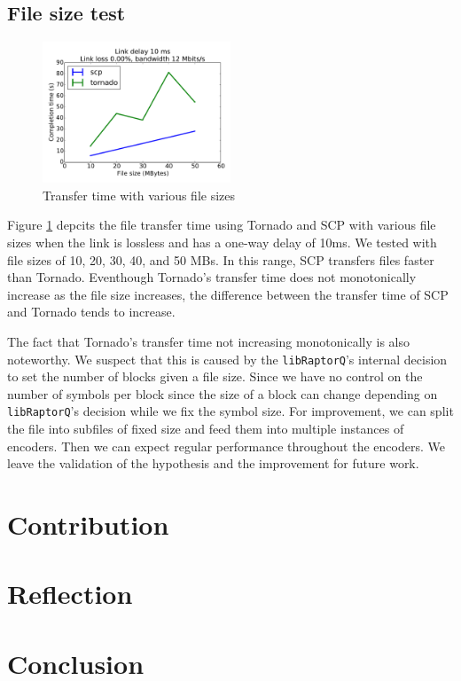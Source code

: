 \documentclass{sig-alternate-10pt}
\begin{document}
\subsection{File size test}

\begin{figure}[t]
  \centering
  \includegraphics[width=0.5\textwidth]{filesize-plot}
  \caption{Transfer time with various file sizes}
  \label{f:filesize-plot}
\end{figure}

Figure \ref{f:filesize-plot} depcits the file transfer time using Tornado and
SCP with various file sizes when the link is lossless and has a one-way delay of
10ms. We tested with file sizes of 10, 20, 30, 40, and 50 MBs. In this range,
SCP transfers files faster than Tornado. Eventhough Tornado's transfer time does
not monotonically increase as the file size increases, the difference between
the transfer time of SCP and Tornado tends to increase.

The fact that Tornado's transfer time not increasing monotonically is also
noteworthy. We suspect that this is caused by the \texttt{libRaptorQ}'s internal
decision to set the number of blocks given a file size. Since we have no control
on the number of symbols per block since the size of a block can change
depending on \texttt{libRaptorQ}'s decision while we fix the symbol size. For
improvement, we can split the file into subfiles of fixed size and feed them
into multiple instances of encoders. Then we can expect regular performance
throughout the encoders. We leave the validation of the hypothesis and the
improvement for future work.

\section{Contribution}

\section{Reflection}

\section{Conclusion}

\cite{openrq}



\end{document}
